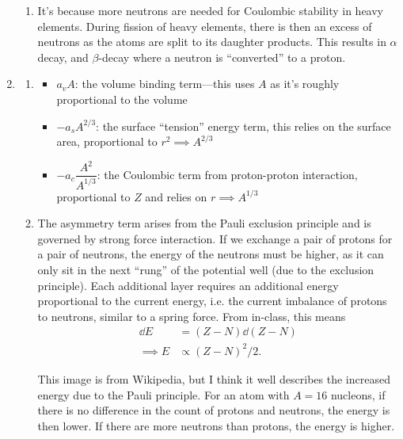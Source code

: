 \documentclass{homework}
\begin{document}
\begin{enumerate}
\begin{enumerate}
			\item It's because more neutrons are needed for Coulombic stability in heavy elements. During fission of heavy elements, there is then an excess of neutrons as the atoms are split to its daughter products. This results in $\alpha$ decay, and $\beta$-decay where a neutron is ``converted'' to a proton.
		\end{enumerate}
	
	\pagebreak
	
		\item \begin{enumerate}
			\item \begin{itemize}
				\item $a_v A$: the volume binding term---this uses $A$ as it's roughly proportional to the volume
				\item $-a_s A^{2/3}$: the surface ``tension'' energy term, this relies on the surface area, proportional to $r^2 \implies A^{2/3}$
				\item $-a_c \dfrac{A^2}{A^{1/3}}$: the Coulombic term from proton-proton interaction, proportional to $Z$ and relies on $r \implies A^{1/3}$
			\end{itemize}
		
			\item The asymmetry term arises from the Pauli exclusion principle and is governed by strong force interaction. If we exchange a pair of protons for a pair of neutrons, the energy of the neutrons must be higher, as it can only sit in the next ``rung'' of the potential well (due to the exclusion principle). Each additional layer requires an additional energy proportional to the current energy, i.e. the current imbalance of protons to neutrons, similar to a spring force. From in-class, this means \begin{align*}
				\dd{E} & = (Z-N) \dd{(Z-N)} \\
				\implies E & \propto (Z-N)^2 / 2.
			\end{align*}
			
			
			This image is from Wikipedia, but I think it well describes the increased energy due to the Pauli principle. For an atom with $A=16$ nucleons, if there is no difference in the count of protons and neutrons, the energy is then lower. If there are more neutrons than protons, the energy is higher.
			

\end{enumerate}
\end{enumerate}
\end{document}
